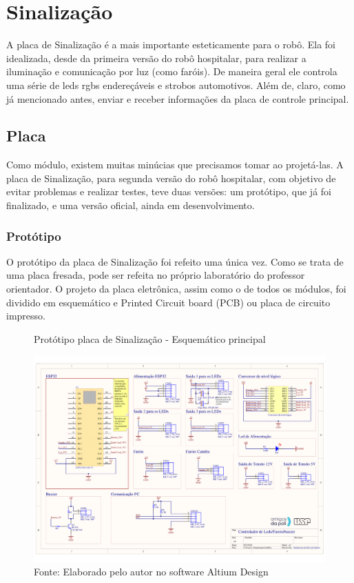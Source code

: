 \documentclass[../poliXuniversity_hospital_-USP-report.tex]{subfiles}
\begin{document}
\clearpage

\section{Sinalização}

A placa de Sinalização é a mais importante esteticamente para o robô. Ela foi idealizada, desde da primeira versão do robô hospitalar, para realizar a iluminação e comunicação por luz (como faróis). De maneira geral ele controla uma série de leds rgbs endereçáveis e strobos automotivos. Além de, claro, como já mencionado antes, enviar e receber informações da placa de controle principal.

\subsection{Placa}

Como módulo, existem muitas minúcias que precisamos tomar ao projetá-las. A placa de Sinalização, para segunda versão do robô hospitalar, com objetivo de evitar problemas e realizar testes, teve duas versões: um protótipo, que já foi finalizado, e uma versão oficial, ainda em desenvolvimento. 

\subsubsection{Protótipo}

O protótipo da placa de Sinalização foi refeito uma única vez. Como se trata de uma placa fresada, pode ser refeita no próprio laboratório do professor orientador. O projeto da placa eletrônica, assim como o de todos os módulos, foi dividido em esquemático e Printed Circuit board (PCB)  ou placa de circuito impresso.

\begin{figure}[!h]
\centering
    \caption{Protótipo placa de Sinalização - Esquemático principal }
    \centering %
    \includegraphics[width=17cm]{modulos/Sinalização-1.png}
    \caption*{Fonte: Elaborado pelo autor no software Altium Design\cite{altium21} }
    \label{Protótipo placa de ## - Esquemático principal}
\end{figure}
\end{document}
